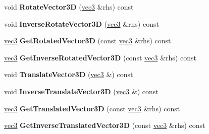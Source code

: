 \begin{DoxyCompactItemize}
\item 
\hypertarget{classmath_1_1mat44_a4770b648241e33ec7f561615b6ea82d8}{
void {\bfseries RotateVector3D} (\hyperlink{classmath_1_1vec3}{vec3} \&rhs) const }
\label{classmath_1_1mat44_a4770b648241e33ec7f561615b6ea82d8}

\item 
\hypertarget{classmath_1_1mat44_a607541d1722f74aca1e77da569098a6b}{
void {\bfseries InverseRotateVector3D} (\hyperlink{classmath_1_1vec3}{vec3} \&rhs) const }
\label{classmath_1_1mat44_a607541d1722f74aca1e77da569098a6b}

\item 
\hypertarget{classmath_1_1mat44_a9f734927f970b9e229ccb8feba7b0f90}{
\hyperlink{classmath_1_1vec3}{vec3} {\bfseries GetRotatedVector3D} (const \hyperlink{classmath_1_1vec3}{vec3} \&rhs) const }
\label{classmath_1_1mat44_a9f734927f970b9e229ccb8feba7b0f90}

\item 
\hypertarget{classmath_1_1mat44_ab7df6c3f87c2b9dd4e38c0d5e196b5d0}{
\hyperlink{classmath_1_1vec3}{vec3} {\bfseries GetInverseRotatedVector3D} (const \hyperlink{classmath_1_1vec3}{vec3} \&rhs) const }
\label{classmath_1_1mat44_ab7df6c3f87c2b9dd4e38c0d5e196b5d0}

\item 
\hypertarget{classmath_1_1mat44_a58401392f08b4497b663adaba5bd4b52}{
void {\bfseries TranslateVector3D} (\hyperlink{classmath_1_1vec3}{vec3} \&) const }
\label{classmath_1_1mat44_a58401392f08b4497b663adaba5bd4b52}

\item 
\hypertarget{classmath_1_1mat44_a7e1bebf79016a071ec1f9bc07892cfcb}{
void {\bfseries InverseTranslateVector3D} (\hyperlink{classmath_1_1vec3}{vec3} \&) const }
\label{classmath_1_1mat44_a7e1bebf79016a071ec1f9bc07892cfcb}

\item 
\hypertarget{classmath_1_1mat44_a6c460a40af97bf84d118c6360daf6ab8}{
\hyperlink{classmath_1_1vec3}{vec3} {\bfseries GetTranslatedVector3D} (const \hyperlink{classmath_1_1vec3}{vec3} \&rhs) const }
\label{classmath_1_1mat44_a6c460a40af97bf84d118c6360daf6ab8}

\item 
\hypertarget{classmath_1_1mat44_a397e537daf2673b1fc7877807f2f48ab}{
\hyperlink{classmath_1_1vec3}{vec3} {\bfseries GetInverseTranslatedVector3D} (const \hyperlink{classmath_1_1vec3}{vec3} \&rhs) const }
\label{classmath_1_1mat44_a397e537daf2673b1fc7877807f2f48ab}


\end{DoxyCompactItemize}
